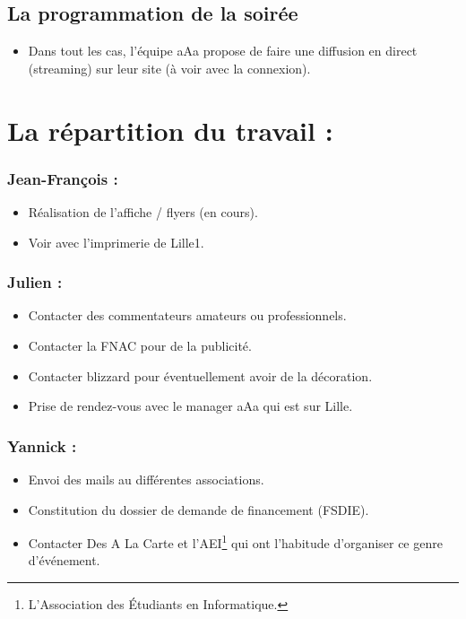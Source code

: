 \subsection{La programmation de la soirée}
\begin{itemize}
\item Dans tout les cas, l'équipe aAa propose de faire une diffusion en direct (streaming) sur leur site (à voir avec la connexion).
\end{itemize}

\section{La répartition du travail :}

\subsubsection{Jean-François :}
\begin{itemize}
\item Réalisation de l'affiche / flyers (en cours).
\item Voir avec l'imprimerie de Lille1.
\end{itemize}

\subsubsection{Julien :}
\begin{itemize}
\item Contacter des commentateurs amateurs ou professionnels.
\item Contacter la FNAC pour de la publicité.
\item Contacter blizzard pour éventuellement avoir de la décoration.
\item Prise de rendez-vous avec le manager aAa qui est sur Lille.
\end{itemize}

\subsubsection{Yannick :}
\begin{itemize}
\item Envoi des mails au différentes associations.
\item Constitution du dossier de demande de financement (FSDIE).
\item Contacter \og Des A La Carte \fg{} et l'AEI\footnote{L'Association des Étudiants en Informatique.} qui ont l'habitude d'organiser ce genre d’événement.
\end{itemize}
